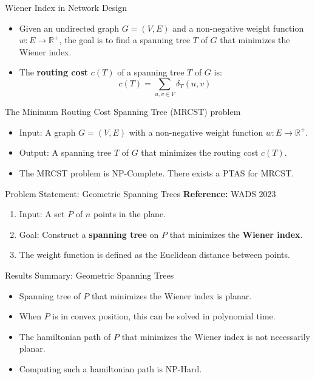 \documentclass[11pt]{beamer}
\begin{document}
\begin{frame}{Wiener Index in Network Design}
	\begin{itemize}
		\item Given an undirected graph $G = (V, E)$ and a non-negative weight function $w: E \to \mathbb{R}^+$, the goal is to find a spanning tree $T$ of $G$ that minimizes the Wiener index.
		      \pause
		\item The \textbf{routing cost} $c(T)$ of a spanning tree $T$ of $G$ is:
		      \[
			      c(T) = \sum_{u, v \in V} \delta_T(u, v)
		      \]
		      \pause
	\end{itemize}

	\begin{block}{The Minimum Routing Cost Spanning Tree (MRCST) problem}
		\begin{itemize}
			\item Input: A graph $G = (V, E)$ with a non-negative weight function $w: E \to \mathbb{R}^+$.
			\item Output: A spanning tree $T$ of $G$ that minimizes the routing cost $c(T)$.
		\end{itemize}
	\end{block}
	\begin{itemize}
		\pause
		\item The MRCST problem is NP-Complete. There exists a PTAS for MRCST.
	\end{itemize}
\end{frame}

\begin{frame}{Problem Statement: Geometric Spanning Trees}
	\textbf{Reference:} WADS 2023 ~\cite{article:geometric_spanning_trees_minimizing_wiener_index}

	\begin{enumerate}
		\item Input: A set $P$ of $n$ points in the plane.
		      \pause
		\item Goal: Construct a \textbf{spanning tree} on $P$ that minimizes the \textbf{Wiener index}.
		      \pause
		\item The weight function is defined as the Euclidean distance between points.
	\end{enumerate}
\end{frame}

\begin{frame}{Results Summary: Geometric Spanning Trees}
	\begin{itemize}
		\item Spanning tree of $P$ that minimizes the Wiener index is planar.
		      \pause
		\item When $P$ is in convex position, this can be solved in polynomial time.
		      \pause
		\item The hamiltonian path of $P$ that minimizes the Wiener index is not necessarily planar.
		      \pause
		\item Computing such a hamiltonian path is NP-Hard.
	\end{itemize}
\end{frame}
\end{document}

